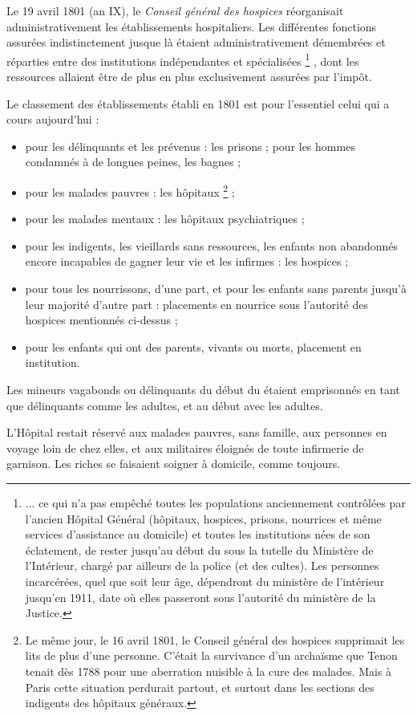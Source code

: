  Le 19 avril 1801 (an IX), le \emph{Conseil général des hospices} réorganisait administrativement les établissements hospitaliers. Les différentes fonctions assurées indistinctement jusque là étaient administrativement démembrées et réparties entre des institutions indépendantes et spécialisées%
\footnote{... ce qui n'a pas empêché toutes les populations anciennement contrôlées par l'ancien Hôpital Général (hôpitaux, hospices, prisons, nourrices et même services d'assistance au domicile) et toutes les institutions nées de son éclatement, de rester jusqu'au début du  sous la tutelle du Ministère de l'Intérieur, chargé par ailleurs de la police (et des cultes). Les personnes incarcérées, quel que soit leur âge, dépendront du ministère de l'intérieur jusqu'en 1911, date où elles passeront sous l'autorité du ministère de la Justice.}%
, dont les ressources allaient être de plus en plus exclusivement assurées par l'impôt. 

 Le classement des établissements établi en 1801 est pour l'essentiel celui qui a cours aujourd'hui :
\begin{itemize}
\item pour les délinquants et les prévenus : les prisons ; pour les hommes condamnés à de longues peines, les bagnes ;
\item pour les malades pauvres : les hôpitaux%
\footnote{Le même jour, le 16 avril 1801, le Conseil général des hospices supprimait les lits de plus d'une personne. C'était la survivance d'un archaïsme que Tenon tenait dès 1788 pour une aberration nuisible à la cure des malades. Mais à Paris cette situation perdurait partout, et surtout dans les sections des indigents des hôpitaux généraux.} 
;
\item pour les malades mentaux : les hôpitaux psychiatriques ;
\item pour les indigents, les vieillards sans ressources, les enfants non abandonnés encore incapables de gagner leur vie et les infirmes : les hospices ;
\item pour tous les nourrissons, d'une part, et pour les enfants sans parents jusqu'à leur majorité d'autre part : placements en nourrice sous l'autorité des hospices mentionnés ci-dessus ;
\item pour les enfants qui ont des parents, vivants ou morts, placement en institution.
\end{itemize}

 Les mineurs vagabonds ou délinquants du début du  étaient emprisonnés en tant que délinquants comme les adultes, et au début avec les adultes. 

 L'Hôpital restait réservé aux malades pauvres, sans famille, aux personnes en voyage loin de chez elles, et aux militaires éloignés de toute infirmerie de garnison. Les riches se faisaient soigner à domicile, comme toujours.


